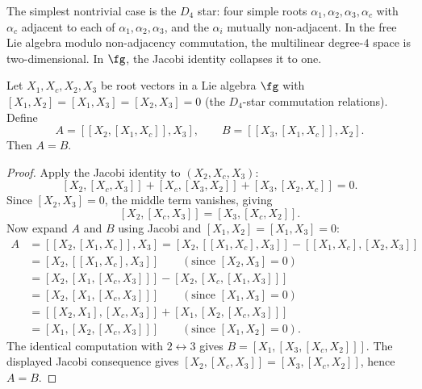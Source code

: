 The simplest nontrivial case is the $D_4$ star: four simple roots
$\alpha_1,\alpha_2,\alpha_3,\alpha_c$ with $\alpha_c$ adjacent to
each of $\alpha_1,\alpha_2,\alpha_3$, and the $\alpha_i$ mutually
non-adjacent. In the free Lie algebra modulo non-adjacency
commutation, the multilinear degree-$4$ space is two-dimensional.
In $\fg$, the Jacobi identity collapses it to one.

\begin{lemma}
\label{lem:jacobi-collapse-v1}
Let $X_1,X_c,X_2,X_3$ be root vectors in a Lie algebra $\fg$ with
$[X_1,X_2]=[X_1,X_3]=[X_2,X_3]=0$ (the $D_4$-star commutation
relations). Define
\[
A = [[X_2,[X_1,X_c]],X_3],
\qquad
B = [[X_3,[X_1,X_c]],X_2].
\]
Then $A=B$.
\end{lemma}

\begin{proof}
Apply the Jacobi identity to $(X_2,X_c,X_3)$:
\[
[X_2,[X_c,X_3]]+[X_c,[X_3,X_2]]+[X_3,[X_2,X_c]]=0.
\]
Since $[X_2,X_3]=0$, the middle term vanishes, giving
\begin{equation}\label{eq:jacobi-star-v1}
[X_2,[X_c,X_3]]=[X_3,[X_c,X_2]].
\end{equation}
Now expand $A$ and $B$ using Jacobi and $[X_1,X_2]=[X_1,X_3]=0$:
\begin{align*}
A &= [[X_2,[X_1,X_c]],X_3]
 = [X_2,[[X_1,X_c],X_3]] - [[X_1,X_c],[X_2,X_3]]\\
 &= [X_2,[[X_1,X_c],X_3]]
 \qquad(\text{since }[X_2,X_3]=0)\\
 &= [X_2,[X_1,[X_c,X_3]]] - [X_2,[X_c,[X_1,X_3]]]\\
 &= [X_2,[X_1,[X_c,X_3]]]
 \qquad(\text{since }[X_1,X_3]=0)\\
 &= [[X_2,X_1],[X_c,X_3]] + [X_1,[X_2,[X_c,X_3]]]\\
 &= [X_1,[X_2,[X_c,X_3]]]
 \qquad(\text{since }[X_1,X_2]=0).
\end{align*}
The identical computation with $2\leftrightarrow 3$ gives
$B=[X_1,[X_3,[X_c,X_2]]]$. The displayed Jacobi consequence gives
$[X_2,[X_c,X_3]]=[X_3,[X_c,X_2]]$, hence $A=B$.
\end{proof}

